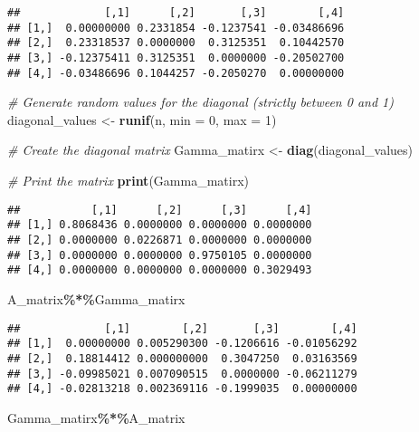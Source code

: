 \documentclass[
]{article}
\newenvironment{Shaded}{\begin{snugshade}}{\end{snugshade}}
\newcommand{\AttributeTok}[1]{\textcolor[rgb]{0.13,0.29,0.53}{#1}}
\newcommand{\CommentTok}[1]{\textcolor[rgb]{0.56,0.35,0.01}{\textit{#1}}}
\newcommand{\DecValTok}[1]{\textcolor[rgb]{0.00,0.00,0.81}{#1}}
\newcommand{\FunctionTok}[1]{\textcolor[rgb]{0.13,0.29,0.53}{\textbf{#1}}}
\newcommand{\NormalTok}[1]{#1}
\newcommand{\OtherTok}[1]{\textcolor[rgb]{0.56,0.35,0.01}{#1}}
\newcommand{\SpecialCharTok}[1]{\textcolor[rgb]{0.81,0.36,0.00}{\textbf{#1}}}
\begin{document}
\begin{verbatim}
##             [,1]      [,2]       [,3]        [,4]
## [1,]  0.00000000 0.2331854 -0.1237541 -0.03486696
## [2,]  0.23318537 0.0000000  0.3125351  0.10442570
## [3,] -0.12375411 0.3125351  0.0000000 -0.20502700
## [4,] -0.03486696 0.1044257 -0.2050270  0.00000000
\end{verbatim}

\begin{Shaded}
\begin{Highlighting}[]
\CommentTok{\# Generate random values for the diagonal (strictly between 0 and 1)}
\NormalTok{diagonal\_values }\OtherTok{\textless{}{-}} \FunctionTok{runif}\NormalTok{(n, }\AttributeTok{min =} \DecValTok{0}\NormalTok{, }\AttributeTok{max =} \DecValTok{1}\NormalTok{)}

\CommentTok{\# Create the diagonal matrix}
\NormalTok{Gamma\_matirx }\OtherTok{\textless{}{-}} \FunctionTok{diag}\NormalTok{(diagonal\_values)}

\CommentTok{\# Print the matrix}
\FunctionTok{print}\NormalTok{(Gamma\_matirx)}
\end{Highlighting}
\end{Shaded}

\begin{verbatim}
##           [,1]      [,2]      [,3]      [,4]
## [1,] 0.8068436 0.0000000 0.0000000 0.0000000
## [2,] 0.0000000 0.0226871 0.0000000 0.0000000
## [3,] 0.0000000 0.0000000 0.9750105 0.0000000
## [4,] 0.0000000 0.0000000 0.0000000 0.3029493
\end{verbatim}

\begin{Shaded}
\begin{Highlighting}[]
\NormalTok{A\_matrix}\SpecialCharTok{\%*\%}\NormalTok{Gamma\_matirx}
\end{Highlighting}
\end{Shaded}

\begin{verbatim}
##             [,1]        [,2]       [,3]        [,4]
## [1,]  0.00000000 0.005290300 -0.1206616 -0.01056292
## [2,]  0.18814412 0.000000000  0.3047250  0.03163569
## [3,] -0.09985021 0.007090515  0.0000000 -0.06211279
## [4,] -0.02813218 0.002369116 -0.1999035  0.00000000
\end{verbatim}

\begin{Shaded}
\begin{Highlighting}[]
\NormalTok{Gamma\_matirx}\SpecialCharTok{\%*\%}\NormalTok{A\_matrix}
\end{Highlighting}
\end{Shaded}
\end{document}
